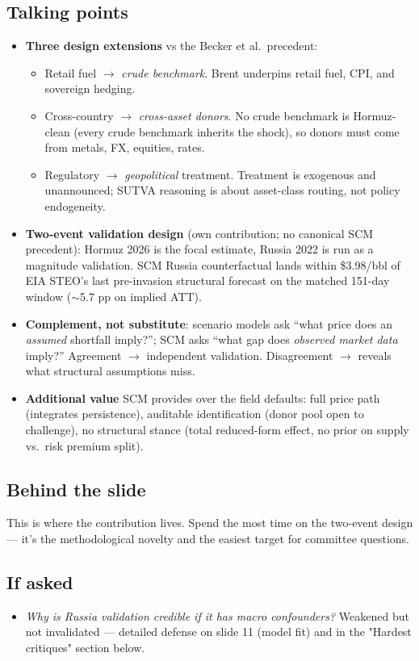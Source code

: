 \documentclass[11pt,a4paper]{article}
\newcommand{\highlight}[1]{\textcolor{accent}{\textbf{#1}}}
\begin{document}
\subsection{Talking points}
\begin{itemize}
  \item \highlight{Three design extensions} vs the Becker et al.\ precedent:
  \begin{itemize}
    \item Retail fuel $\to$ \emph{crude benchmark}. Brent underpins retail fuel, CPI, and sovereign hedging.
    \item Cross-country $\to$ \emph{cross-asset donors}. No crude benchmark is Hormuz-clean (every crude benchmark inherits the shock), so donors must come from metals, FX, equities, rates.
    \item Regulatory $\to$ \emph{geopolitical} treatment. Treatment is exogenous and unannounced; SUTVA reasoning is about asset-class routing, not policy endogeneity.
  \end{itemize}
  \item \highlight{Two-event validation design} (own contribution; no canonical SCM precedent): Hormuz 2026 is the focal estimate, Russia 2022 is run as a magnitude validation. SCM Russia counterfactual lands within \$3.98/bbl of EIA STEO's last pre-invasion structural forecast on the matched 151-day window ($\sim$5.7 pp on implied ATT).
  \item \highlight{Complement, not substitute}: scenario models ask ``what price does an \emph{assumed} shortfall imply?''; SCM asks ``what gap does \emph{observed market data} imply?'' Agreement $\to$ independent validation. Disagreement $\to$ reveals what structural assumptions miss.
  \item \highlight{Additional value} SCM provides over the field defaults: full price path (integrates persistence), auditable identification (donor pool open to challenge), no structural stance (total reduced-form effect, no prior on supply vs.\ risk premium split).
\end{itemize}

\subsection{Behind the slide}
This is where the contribution lives. Spend the most time on the two-event design --- it's the methodological novelty and the easiest target for committee questions.

\subsection{If asked}
\begin{itemize}
  \item \textit{Why is Russia validation credible if it has macro confounders?} Weakened but not invalidated --- detailed defense on slide 11 (model fit) and in the "Hardest critiques" section below.
\end{itemize}
\end{document}

